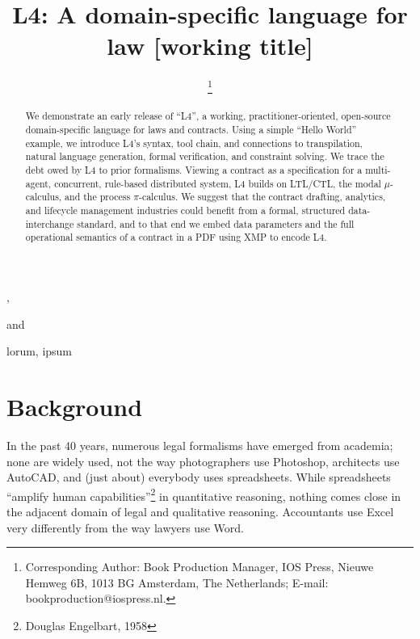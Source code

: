 \documentclass{IOS-Book-Article}
\def\hb{\hbox to 10.7 cm{}}
\begin{document}
\pagestyle{headings}
\def\thepage{}

\begin{frontmatter}              %

\title{L4: A domain-specific language for law [working title]}

\markboth{}{September 2020\hb}

\author[A]{ %
\thanks{Corresponding Author: Book Production Manager, IOS Press, Nieuwe Hemweg 6B,
1013 BG Amsterdam, The Netherlands; E-mail:
bookproduction@iospress.nl.}},
\author[B]{ }
and
\author[B]{ }

\address[A]{Book Department, IOS Press, The Netherlands}
\address[B]{Short Affiliation of Second Author and Third Author}

\begin{abstract}
We demonstrate an early release of ``L4'', a working, practitioner-oriented, open-source domain-specific language for laws and contracts. Using a simple ``Hello World'' example, we introduce L4's syntax, tool chain, and connections to transpilation, natural language generation, formal verification, and constraint solving. We trace the debt owed by L4 to prior formalisms. Viewing a contract as a specification for a multi-agent, concurrent, rule-based distributed system, L4 builds on LTL/CTL, the modal $\mu$-calculus, and the process $\pi$-calculus. We suggest that the contract drafting, analytics, and lifecycle management industries could benefit from a formal, structured data-interchange standard, and to that end we embed data parameters and the full operational semantics of a contract in a PDF using XMP to encode L4.
\end{abstract}

\begin{keyword}
lorum, ipsum
\end{keyword}
\end{frontmatter}
\markboth{September 2020\hb}{September 2020\hb}

\section{Background}

In the past 40 years, numerous legal formalisms have emerged from academia; none are widely used, not the way photographers use Photoshop, architects use AutoCAD, and (just about) everybody uses spreadsheets. While spreadsheets ``amplify human capabilities''\footnote{Douglas Engelbart, 1958} in quantitative reasoning, nothing comes close in the adjacent domain of legal and qualitative reasoning. Accountants use Excel very differently from the way lawyers use Word.
    
\end{document}
